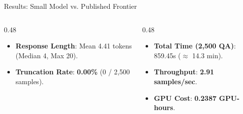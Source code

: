 \documentclass[aspectratio=169, 10pt]{beamer}
\begin{document}
\begin{frame}{Results: Small Model vs. Published Frontier}
    \vspace{0.2cm}
    \begin{columns}[T]
        \begin{column}{0.48\textwidth}
            \begin{tcolorbox}[title=\textbf{Diagnostics Telemetry}]
                \small
                \begin{itemize}
                    \item \textbf{Response Length}: Mean 4.41 tokens (Median 4, Max 20).
                    \item \textbf{Truncation Rate}: \textbf{0.00\%} (0 / 2,500 samples).
                \end{itemize}
            \end{tcolorbox}
        \end{column}

        \begin{column}{0.48\textwidth}
            \begin{tcolorbox}[title=\textbf{Computational Efficiency}]
                \small
                \begin{itemize}
                    \item \textbf{Total Time (2,500 QA)}: 859.45s ($\approx$ 14.3 min).
                    \item \textbf{Throughput}: \textbf{2.91 samples/sec}.
                    \item \textbf{GPU Cost}: \textbf{0.2387 GPU-hours}.
                \end{itemize}
            \end{tcolorbox}
        \end{column}
    \end{columns}
\end{frame}
\end{document}
